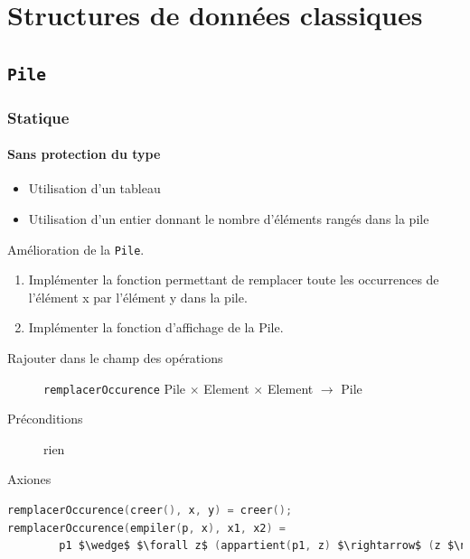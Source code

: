 \chapter{Structures de données classiques}
\section{\texttt{Pile}}

	\subsection{Statique}
	\subsubsection{Sans protection du type}
\begin{itemize}
	\item Utilisation d'un tableau
	\item Utilisation d'un entier donnant le nombre d'éléments rangés dans la pile
\end{itemize}


Amélioration de la \texttt{Pile}.
\begin{enumerate}
	\item Implémenter la fonction permettant de remplacer toute les occurrences de l'élément x par l'élément y dans la pile.
	\item Implémenter la fonction d'affichage de la Pile.
\end{enumerate}
\begin{description}
	\item[Rajouter dans le champ des opérations] \texttt{remplacerOccurence} Pile $\times$ Element $\times$ Element $\rightarrow$ Pile
	\item[Préconditions] rien
	\item[Axiones]
\end{description}

\begin{lstlisting}[language=C]
remplacerOccurence(creer(), x, y) = creer();
remplacerOccurence(empiler(p, x), x1, x2) = 
		p1 $\wedge$ $\forall z$ (appartient(p1, z) $\rightarrow$ (z $\neq$ x1) (empiler(p, x), z') $\wedge$ z' = x1))
\end{lstlisting}

